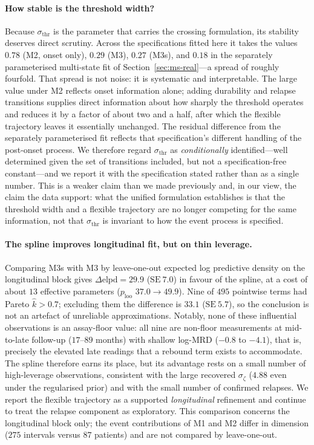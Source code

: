 \documentclass[11pt]{article}
\begin{document}
\paragraph{How stable is the threshold width?}
Because $\sigma_{\mathrm{thr}}$ is the parameter that carries the crossing
formulation, its stability deserves direct scrutiny. Across the specifications
fitted here it takes the values $0.78$ (M2, onset only), $0.29$ (M3), $0.27$
(M3s), and $0.18$ in the separately parameterised multi-state fit of
Section~\ref{sec:ms-real}---a spread of roughly fourfold. That spread is not
noise: it is systematic and interpretable. The large value under M2 reflects
onset information alone; adding durability and relapse transitions supplies
direct information about how sharply the threshold operates and reduces it by a
factor of about two and a half, after which the flexible trajectory leaves it
essentially unchanged. The residual difference from the separately
parameterised fit reflects that specification's different handling of the
post-onset process. We therefore regard $\sigma_{\mathrm{thr}}$ as
\emph{conditionally} identified---well determined given the set of transitions
included, but not a specification-free constant---and we report it with the
specification stated rather than as a single number. This is a weaker claim than
we made previously and, in our view, the claim the data support: what the
unified formulation establishes is that the threshold width and a flexible
trajectory are no longer competing for the same information, not that
$\sigma_{\mathrm{thr}}$ is invariant to how the event process is specified.

\paragraph{The spline improves longitudinal fit, but on thin leverage.}
Comparing M3s with M3 by leave-one-out expected log predictive density on the
longitudinal block gives $\Delta\mathrm{elpd}=29.9$ ($\mathrm{SE}\ 7.0$) in
favour of the spline, at a cost of about $13$ effective parameters
($p_{\mathrm{loo}}$ $37.0\to49.9$). Nine of $495$ pointwise terms had Pareto
$\hat k>0.7$; excluding them the difference is $33.1$ ($\mathrm{SE}\ 5.7$), so
the conclusion is not an artefact of unreliable approximations. Notably, none
of these influential observations is an assay-floor value: all nine are
non-floor measurements at mid-to-late follow-up ($17$--$89$ months) with
shallow log-MRD ($-0.8$ to $-4.1$), that is, precisely the elevated late
readings that a rebound term exists to accommodate. The spline therefore earns
its place, but its advantage rests on a small number of high-leverage
observations, consistent with the large recovered $\sigma_\zeta$ ($4.88$ even
under the regularised prior) and with the small number of confirmed relapses.
We report the flexible trajectory as a supported \emph{longitudinal}
refinement and continue to treat the relapse component as exploratory. This
comparison concerns the longitudinal block only; the event contributions of M1
and M2 differ in dimension ($275$ intervals versus $87$ patients) and are not
compared by leave-one-out.
\end{document}
